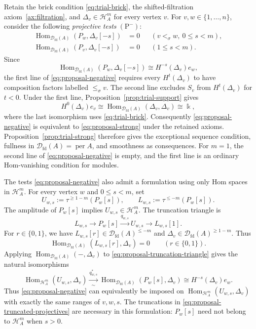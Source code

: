 \documentclass[11pt,a4paper]{article}
\newcommand{\defn}[1]{\textsl{\color{darkblue} #1}}
\newcommand{\D}{\mathcal D}
\renewcommand{\H}{\mathcal H}
\newcommand{\std}{\Delta}
\DeclareMathOperator{\fd}{fd}
\DeclareMathOperator{\Hom}{Hom}
\DeclareMathOperator{\per}{per}
\theoremstyle{plain}
\theoremstyle{definition}
\numberwithin{equation}{section}
\begin{document}
Retain the brick condition \eqref{eq:trial-brick}, the shifted-filtration
axiom~\ref{ax:filtration}, and $\std_v\in\H_A^m$ for every vertex $v$.
For $v,w\in\{1,\ldots,n\}$, consider the following
\defn{projective tests} $(\mathrm P^-)$:
\begin{equation*}\tag{P-}\label{eq:proposal-negative}
 \begin{aligned}
 \Hom_{\D_{\fd}(A)}(P_w,\std_v[-s])&=0
 &&(v<_\sigma w,\ 0\leq s<m),\\
 \Hom_{\D_{\fd}(A)}(P_v,\std_v[-s])&=0
 &&(1\leq s<m).
 \end{aligned}
\end{equation*}
Since
\begin{equation}\label{eq:proposal-projective-cohomology}
 \Hom_{\D_{\fd}(A)}(P_w,\std_v[-s])
 \cong H^{-s}(\std_v)e_w,
\end{equation}
the first line of \eqref{eq:proposal-negative} requires every
$H^t(\std_v)$ to have composition factors labelled $\leq_\sigma v$.
The second line excludes $S_v$ from $H^t(\std_v)$ for $t<0$.
Under the first line, Proposition~\ref{prop:trial-support} gives
\[
 H^0(\std_v)e_v
 \cong\Hom_{\D_{\fd}(A)}(\std_v,\std_v)
 \cong\Bbbk,
\]
where the last isomorphism uses \eqref{eq:trial-brick}.
Consequently \eqref{eq:proposal-negative} is equivalent to
\eqref{eq:proposal-strong} under the retained axioms.
Proposition~\ref{prop:trial-strong} therefore gives the exceptional
sequence condition, fullness in $\D_{\fd}(A)=\per A$, and smoothness
as consequences. For $m=1$, the second line of
\eqref{eq:proposal-negative} is empty, and the first line is an
ordinary Hom-vanishing condition for modules.

The tests \eqref{eq:proposal-negative} also admit a formulation using
only Hom spaces in $\H_A^m$. For every vertex $w$ and $0\leq s<m$, set
\begin{equation}\label{eq:proposal-truncated-projectives}
 U_{w,s}:=\tau^{\geq1-m}(P_w[s]),\qquad
 L_{w,s}:=\tau^{\leq-m}(P_w[s]).
\end{equation}
The amplitude of $P_w[s]$ implies $U_{w,s}\in\H_A^m$. The truncation
triangle is
\begin{equation}\label{eq:proposal-truncation-triangle}
 L_{w,s}\longrightarrow P_w[s]
 \xrightarrow{q_{w,s}}U_{w,s}\longrightarrow L_{w,s}[1].
\end{equation}
For $r\in\{0,1\}$, we have
$L_{w,s}[r]\in\D_{\fd}(A)^{\leq-m}$ and
$\std_v\in\D_{\fd}(A)^{\geq1-m}$. Thus
\[
 \Hom_{\D_{\fd}(A)}(L_{w,s}[r],\std_v)=0
 \qquad(r\in\{0,1\}).
\]
Applying $\Hom_{\D_{\fd}(A)}(-,\std_v)$ to
\eqref{eq:proposal-truncation-triangle} gives the natural isomorphisms
\begin{equation}\label{eq:proposal-intrinsic-projective-tests}
 \Hom_{\H_A^m}(U_{w,s},\std_v)
 \xrightarrow[\sim]{q_{w,s}^{*}}
 \Hom_{\D_{\fd}(A)}(P_w[s],\std_v)
 \cong H^{-s}(\std_v)e_w.
\end{equation}
Thus \eqref{eq:proposal-negative} can equivalently be imposed on
$\Hom_{\H_A^m}(U_{w,s},\std_v)$ with exactly the same ranges of
$v,w,s$. The truncations in \eqref{eq:proposal-truncated-projectives}
are necessary in this formulation: $P_w[s]$ need not belong to
$\H_A^m$ when $s>0$.
\end{document}
